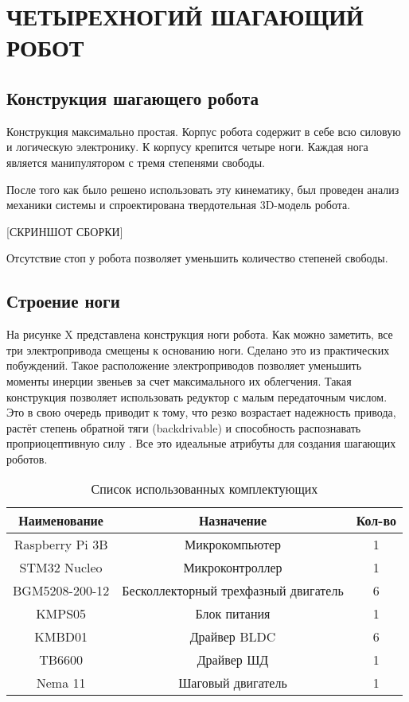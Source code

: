 \chapter{\MakeUppercase{Четырехногий шагающий робот}}
\section{Конструкция шагающего робота}
Конструкция максимально простая. Корпус робота содержит в себе всю силовую и логическую электронику. К корпусу крепится четыре ноги. Каждая нога является манипулятором с тремя степенями свободы. 

После того как было решено использовать эту кинематику, был проведен анализ механики системы и спроектирована твердотельная 3D-модель робота.

\begin{center}
    [СКРИНШОТ СБОРКИ]
\end{center}

Отсутствие стоп у робота позволяет уменьшить количество степеней свободы.

\section{Строение ноги}

На рисунке X представлена конструкция ноги робота. Как можно заметить, все три электропривода смещены к основанию ноги. Сделано это из практических побуждений. Такое расположение электроприводов позволяет уменьшить моменты инерции звеньев за счет максимального их облегчения. Такая конструкция позволяет использовать редуктор с малым передаточным числом. Это в свою очередь приводит к тому, что резко возрастает надежность привода, растёт степень обратной тяги (backdrivable) и способность распознавать проприоцептивную силу \cite{Seok2012}. Все это идеальные атрибуты для создания шагающих роботов.

\begin{table}[ht]
    \caption{Список использованных комплектующих}
    \label{tab_stuff}
    \centering
    \begin{tabular}{|c|c|c|}
        \hline Наименование     & Назначение        & Кол-во \\
        \hline Raspberry Pi 3B  & Микрокомпьютер    & 1 \\
        \hline STM32 Nucleo     & Микроконтроллер   & 1 \\
        \hline BGM5208-200-12   & Бесколлекторный трехфазный двигатель & 6 \\
        \hline KMPS05           & Блок питания      & 1 \\
        \hline KMBD01           & Драйвер BLDC      & 6 \\
        \hline TB6600           & Драйвер ШД        & 1 \\
        \hline Nema 11          & Шаговый двигатель & 1 \\
        \hline
    \end{tabular}
\end{table}

